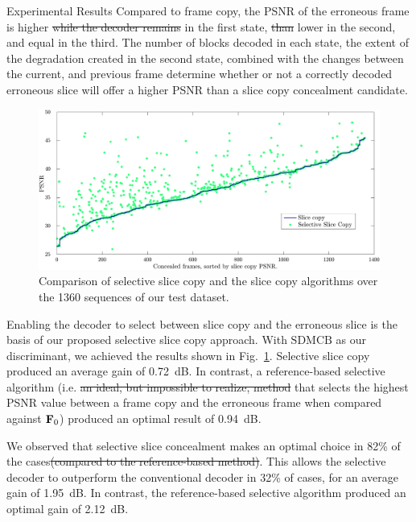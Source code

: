 \documentclass{article}
\providecommand{\DIFaddtex}[1]{{\protect\color{blue}\uwave{#1}}} %
\providecommand{\DIFdeltex}[1]{{\protect\color{red}\sout{#1}}}                      %
\providecommand{\DIFaddbegin}{} %
\providecommand{\DIFaddend}{} %
\providecommand{\DIFdelbegin}{} %
\providecommand{\DIFdelend}{} %
\providecommand{\DIFadd}[1]{\texorpdfstring{\DIFaddtex{#1}}{#1}} %
\providecommand{\DIFdel}[1]{\texorpdfstring{\DIFdeltex{#1}}{}} %
\begin{document}
\begin{section}{Experimental Results}
\DIFdelend Compared to frame copy, the
PSNR of the erroneous frame is higher \DIFdelbegin \DIFdel{while the decoder remains }\DIFdelend in the first state, \DIFdelbegin \DIFdel{than }\DIFdelend lower in the second,
and equal in the third. The number of blocks decoded in each state, the
extent of the degradation created in the second state, combined with the
changes between the current, and previous frame determine whether or not 
a correctly decoded erroneous slice will offer a higher PSNR than a slice copy 
concealment candidate.

\begin{figure}[t]
\centering
\includegraphics[width=\linewidth]{graphics/selectiveSliceCopy.pdf}\vspace{-1em}
\caption{\small{}Comparison of selective slice copy and the slice copy algorithms over
the 1360 sequences of our test dataset.}
\label{fig-SelectiveSliceCopy}
\end{figure}

Enabling the decoder to select between slice copy and the erroneous slice is the
basis of our proposed selective slice copy approach. With $\textrm{SDMCB}$ as
our discriminant, we achieved the results shown in
Fig.~\ref{fig-SelectiveSliceCopy}. Selective slice copy produced an average gain
of 0.72~dB. In contrast, a reference-based selective algorithm (i.e. \DIFdelbegin \DIFdel{an ideal, 
but impossible to realize, method }\DIFdelend \DIFaddbegin \DIFadd{one }\DIFaddend that
selects the highest PSNR value between a frame copy and the erroneous frame when
compared against $\mathbf{F}_{0}$) produced an optimal result of 0.94~dB. 

We observed that selective slice concealment makes an optimal choice in
82\% of the cases\DIFdelbegin \DIFdel{(compared to the reference-based method)}\DIFdelend . This allows the selective decoder to outperform the
conventional decoder in 32\% of cases, for an average gain of 1.95~dB.
In contrast, the reference-based selective algorithm produced an optimal gain of
2.12~dB.


\end{section}
\end{document}
